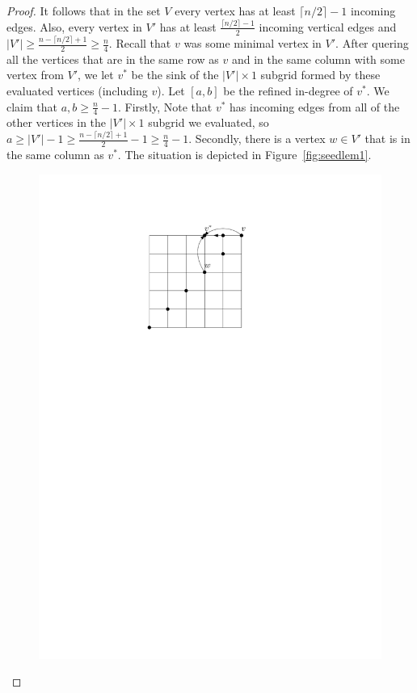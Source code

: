 \documentclass[a4paper,10pt]{article}
\newcommand{\indegree}{refined in-degree\xspace}
\begin{document}
\begin{proof}
  It follows that in the set $V$ every vertex has at least $\lceil n/2 \rceil - 1$ incoming edges. Also, every vertex in $V'$ has at least $\frac{\lceil n/2\rceil-1}{2}$ incoming vertical edges and $|V'| \geq \frac{n-\lceil n/2\rceil + 1}{2} \geq \frac{n}{4}$. Recall that $v$ was some minimal vertex in $V'$. 
  After quering all the vertices that are in the same row as $v$ and in the same column with some vertex from $V'$, we let $v^*$ be the sink of the $|V'|\times 1$ subgrid formed by these evaluated vertices (including $v$). Let $[a,b]$ be the \indegree of $v^*$. We claim that $a, b \geq \frac{n}{4} - 1$. Firstly, Note that $v^*$ has incoming edges from all of the other vertices in the $|V'|\times 1$ subgrid we evaluated, so $a \geq |V'|-1 \geq \frac{n-\lceil n/2\rceil + 1}{2} - 1 \geq \frac{n}{4} - 1$. Secondly, there is a vertex $w \in V'$ that is in the same column as $v^*$.
  The situation is depicted in Figure~\ref{fig:seedlem1}.
  \begin{figure}[htbp] 
  	\centering
  	\includegraphics[scale=0.7]{seedlemma_fig1.pdf}

\end{figure}
\end{proof}
\end{document}
